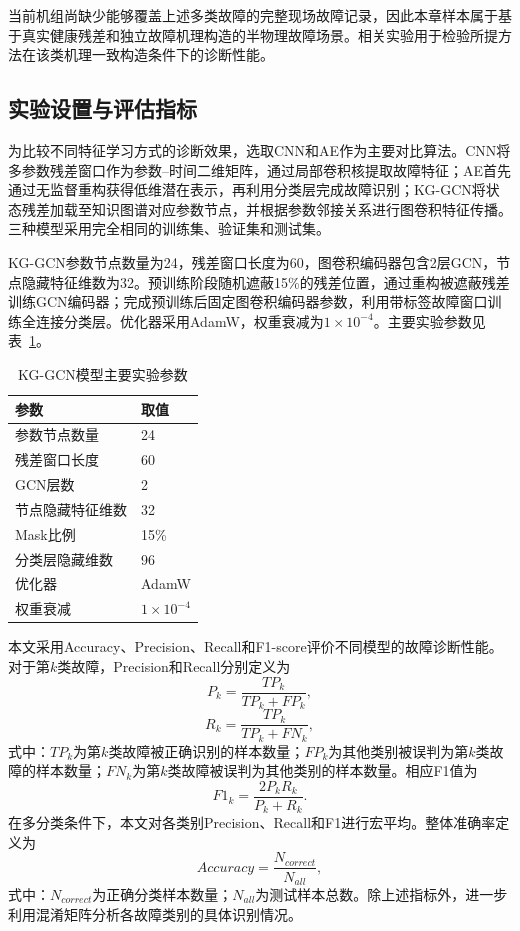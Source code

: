 当前机组尚缺少能够覆盖上述多类故障的完整现场故障记录，因此本章样本属于基于真实健康残差和独立故障机理构造的半物理故障场景。相关实验用于检验所提方法在该类机理一致构造条件下的诊断性能。

\subsection{实验设置与评估指标}
\label{subsec:experiment_setting_v8}

为比较不同特征学习方式的诊断效果，选取CNN和AE作为主要对比算法。CNN将多参数残差窗口作为参数--时间二维矩阵，通过局部卷积核提取故障特征；AE首先通过无监督重构获得低维潜在表示，再利用分类层完成故障识别；KG-GCN将状态残差加载至知识图谱对应参数节点，并根据参数邻接关系进行图卷积特征传播。三种模型采用完全相同的训练集、验证集和测试集。

KG-GCN参数节点数量为24，残差窗口长度为60，图卷积编码器包含2层GCN，节点隐藏特征维数为32。预训练阶段随机遮蔽15\%的残差位置，通过重构被遮蔽残差训练GCN编码器；完成预训练后固定图卷积编码器参数，利用带标签故障窗口训练全连接分类层。优化器采用AdamW，权重衰减为$1\times10^{-4}$。主要实验参数见表~\ref{tab:kg_setting_v8}。

\begin{table}[htbp]
    \centering
    \caption{KG-GCN模型主要实验参数}
    \label{tab:kg_setting_v8}
    \begin{tabular}{ll}
        \toprule
        参数 & 取值 \\
        \midrule
        参数节点数量 & 24 \\
        残差窗口长度 & 60 \\
        GCN层数 & 2 \\
        节点隐藏特征维数 & 32 \\
        Mask比例 & 15\% \\
        分类层隐藏维数 & 96 \\
        优化器 & AdamW \\
        权重衰减 & $1\times10^{-4}$ \\
        \bottomrule
    \end{tabular}
\end{table}

本文采用Accuracy、Precision、Recall和F1-score评价不同模型的故障诊断性能。对于第$k$类故障，Precision和Recall分别定义为
\begin{equation}
P_k=\frac{TP_k}{TP_k+FP_k},
\end{equation}
\begin{equation}
R_k=\frac{TP_k}{TP_k+FN_k},
\end{equation}
式中：$TP_k$为第$k$类故障被正确识别的样本数量；$FP_k$为其他类别被误判为第$k$类故障的样本数量；$FN_k$为第$k$类故障被误判为其他类别的样本数量。相应F1值为
\begin{equation}
F1_k=\frac{2P_kR_k}{P_k+R_k}.
\end{equation}
在多分类条件下，本文对各类别Precision、Recall和F1进行宏平均。整体准确率定义为
\begin{equation}
Accuracy=\frac{N_{correct}}{N_{all}},
\end{equation}
式中：$N_{correct}$为正确分类样本数量；$N_{all}$为测试样本总数。除上述指标外，进一步利用混淆矩阵分析各故障类别的具体识别情况。

